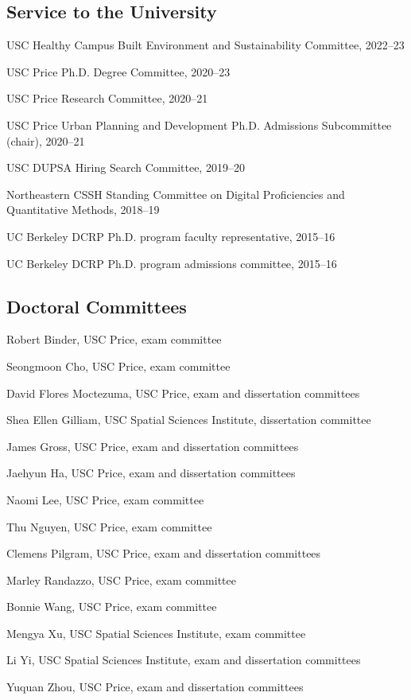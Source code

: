 \documentclass[11pt,letterpaper]{report}
\newcommand{\listitemspace}{0.25em}
\renewenvironment{itemize}
{\begin{list}{}{\setlength{\leftmargin}{0em}
                \setlength{\parskip}{0em}
                \setlength{\itemsep}{\listitemspace}
                \setlength{\parsep}{\listitemspace}}}
{\end{list}}
\begin{document}
    \subsection*{Service to the University}

    \begin{itemize}
        \item USC Healthy Campus Built Environment and Sustainability Committee, 2022--23
        \item USC Price Ph.D. Degree Committee, 2020--23
        \item USC Price Research Committee, 2020--21
        \item USC Price Urban Planning and Development Ph.D. Admissions Subcommittee (chair), 2020--21
        \item USC DUPSA Hiring Search Committee, 2019--20
        \item Northeastern CSSH Standing Committee on Digital Proficiencies and Quantitative Methods, 2018--19
        \item UC Berkeley DCRP Ph.D. program faculty representative, 2015--16
        \item UC Berkeley DCRP Ph.D. program admissions committee, 2015--16

    \end{itemize}

    \subsection*{Doctoral Committees}

    \begin{itemize}

        \item Robert Binder, USC Price, exam committee
        \item Seongmoon Cho, USC Price, exam committee
        \item David Flores Moctezuma, USC Price, exam and dissertation committees
        \item Shea Ellen Gilliam, USC Spatial Sciences Institute, dissertation committee
        \item James Gross, USC Price, exam and dissertation committees
        \item Jaehyun Ha, USC Price, exam and dissertation committees
        \item Naomi Lee, USC Price, exam committee
        \item Thu Nguyen, USC Price, exam committee
        \item Clemens Pilgram, USC Price, exam and dissertation committees
        \item Marley Randazzo, USC Price, exam committee
        \item Bonnie Wang, USC Price, exam committee
        \item Mengya Xu, USC Spatial Sciences Institute, exam committee
        \item Li Yi, USC Spatial Sciences Institute, exam and dissertation committees
        \item Yuquan Zhou, USC Price, exam and dissertation committees

    \end{itemize}
\end{document}
